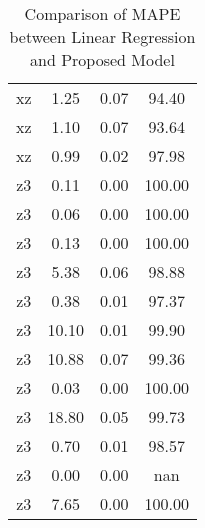 \begin{table}[h]
\begin{tabular}{|c|c|c|c|}
        xz & 1.25 & 0.07 & 94.40 \\
        xz & 1.10 & 0.07 & 93.64 \\
        xz & 0.99 & 0.02 & 97.98 \\
        z3 & 0.11 & 0.00 & 100.00 \\
        z3 & 0.06 & 0.00 & 100.00 \\
        z3 & 0.13 & 0.00 & 100.00 \\
        z3 & 5.38 & 0.06 & 98.88 \\
        z3 & 0.38 & 0.01 & 97.37 \\
        z3 & 10.10 & 0.01 & 99.90 \\
        z3 & 10.88 & 0.07 & 99.36 \\
        z3 & 0.03 & 0.00 & 100.00 \\
        z3 & 18.80 & 0.05 & 99.73 \\
        z3 & 0.70 & 0.01 & 98.57 \\
        z3 & 0.00 & 0.00 & nan \\
        z3 & 7.65 & 0.00 & 100.00 \\
        \hline
    \end{tabular}
    \caption{Comparison of MAPE between Linear Regression and Proposed Model}
    \label{tab:mape}
\end{table}


